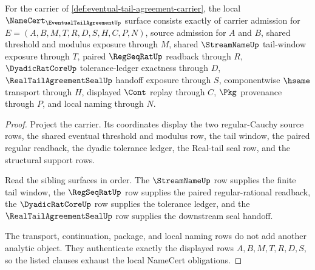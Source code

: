 \begin{theorem}
\label{thm:eventual-tail-agreement-namecert-obligations}
For the carrier of \autoref{def:eventual-tail-agreement-carrier}, the local $\NameCert_{\EventualTailAgreementUp}$ surface consists exactly of carrier admission for $E=(A,B,M,T,R,D,S,H,C,P,N)$, source admission for $A$ and $B$, shared threshold and modulus exposure through $M$, shared $\StreamNameUp$ tail-window exposure through $T$, paired $\RegSeqRatUp$ readback through $R$, $\DyadicRatCoreUp$ tolerance-ledger exactness through $D$, $\RealTailAgreementSealUp$ handoff exposure through $S$, componentwise $\hsame$ transport through $H$, displayed $\Cont$ replay through $C$, $\Pkg$ provenance through $P$, and local naming through $N$.
\end{theorem}
\begin{proof}
Project the carrier. Its coordinates display the two regular-Cauchy source rows, the shared eventual threshold and modulus row, the tail window, the paired regular readback, the dyadic tolerance ledger, the Real-tail seal row, and the structural support rows.

Read the sibling surfaces in order. The $\StreamNameUp$ row supplies the finite tail window, the $\RegSeqRatUp$ row supplies the paired regular-rational readback, the $\DyadicRatCoreUp$ row supplies the tolerance ledger, and the $\RealTailAgreementSealUp$ row supplies the downstream seal handoff.

The transport, continuation, package, and local naming rows do not add another analytic object. They authenticate exactly the displayed rows $A,B,M,T,R,D,S$, so the listed clauses exhaust the local NameCert obligations.
\end{proof}

